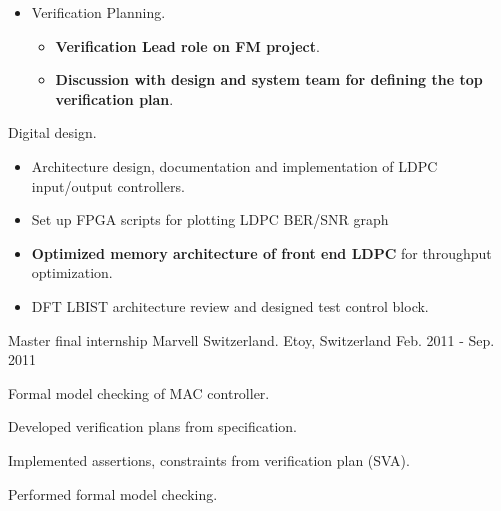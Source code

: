 \begin{cventries}
{\begin{cvitems}
\begin{itemize}
\begin{itemize}
          \end{itemize}
          \item {Verification Planning.}
          \begin{itemize}
            \item {\textbf{Verification Lead role on FM project}.}
            \item {\textbf{Discussion with design and system team for defining the top verification plan}.}
          \end{itemize}
        \end{itemize}
        \item {Digital design.}
        \begin{itemize}
          \item {Architecture design, documentation and implementation of LDPC input/output controllers.}
          \item {Set up FPGA scripts for plotting LDPC BER/SNR graph}
          \item {\textbf{Optimized memory architecture of front end LDPC} for throughput optimization.}
          \item {DFT LBIST architecture review and designed test control block.}
        \end{itemize}
      \end{cvitems}
    }


  \cventry
    {Master final internship} %
    {Marvell Switzerland.} %
    {Etoy, Switzerland} %
    {Feb. 2011 - Sep. 2011} %
    {
      \begin{cvitems} %
        \item {Formal model checking of MAC controller.}
        \item {Developed verification plans from specification.}
        \item {Implemented assertions, constraints from verification plan (SVA).}
        \item {Performed formal model checking.}
      \end{cvitems}
    }


\end{cventries}
